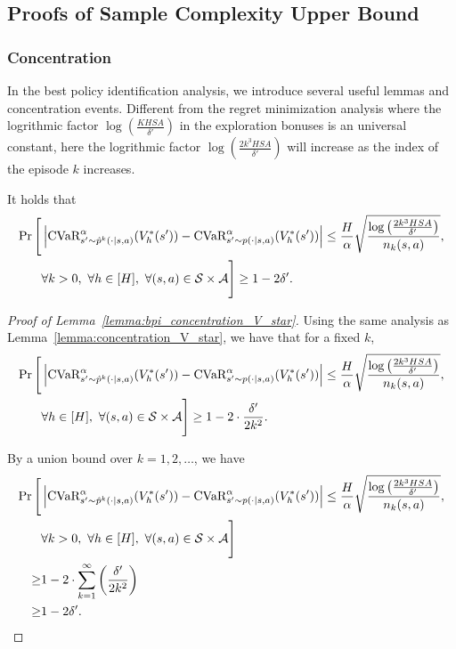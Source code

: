 \subsection{Proofs of Sample Complexity Upper Bound}


\subsubsection{Concentration}

In the best policy identification analysis, we introduce several useful lemmas and concentration events. Different from the regret minimization analysis where the logrithmic factor $\log(\frac{KHSA}{\delta'})$ in the exploration bonuses is an universal constant, here the logrithmic factor $\log(\frac{2 k^3 HSA}{\delta'})$ will increase as the index of the episode $k$ increases.

\begin{lemma} \label{lemma:bpi_concentration_V_star}
	It holds that
	\begin{align*}
		\Pr \Bigg[ & \left| \textup{CVaR}^{\alpha}_{s' \sim \hat{p}^k(\cdot|s,a)}(V^{*}_h(s')) - \textup{CVaR}^{\alpha}_{s' \sim p(\cdot|s,a)}(V^{*}_h(s')) \right| \leq \frac{H}{\alpha}\sqrt{\frac{ \log \left( \frac{2 k^3 HSA}{\delta'} \right) }{n_k(s,a)}} ,
		\\ & \forall k>0,\ \forall h \in [H],\ \forall (s,a) \in \mathcal{S} \times \mathcal{A} \Bigg] \geq 1-2\delta' .
	\end{align*}
\end{lemma}
\begin{proof}[Proof of Lemma~\ref{lemma:bpi_concentration_V_star}]
	Using the same analysis as Lemma~\ref{lemma:concentration_V_star}, we have that for a fixed $k$,
	\begin{align*}
		\Pr \Bigg[ & \left| \textup{CVaR}^{\alpha}_{s' \sim \hat{p}^k(\cdot|s,a)}(V^{*}_h(s')) - \textup{CVaR}^{\alpha}_{s' \sim p(\cdot|s,a)}(V^{*}_h(s')) \right| \leq \frac{H}{\alpha}\sqrt{\frac{ \log \left( \frac{2 k^3 HSA}{\delta'} \right) }{n_k(s,a)}} ,
		\\ & \forall h \in [H],\ \forall (s,a) \in \mathcal{S} \times \mathcal{A} \Bigg] \geq 1-2 \cdot \frac{\delta'}{2 k^2} .
	\end{align*}
	
	By a union bound over $k=1,2,\dots$, we have
	\begin{align*}
		\Pr \Bigg[ & \left| \textup{CVaR}^{\alpha}_{s' \sim \hat{p}^k(\cdot|s,a)}(V^{*}_h(s')) - \textup{CVaR}^{\alpha}_{s' \sim p(\cdot|s,a)}(V^{*}_h(s')) \right| \leq \frac{H}{\alpha}\sqrt{\frac{ \log \left( \frac{2 k^3 HSA}{\delta'} \right) }{n_k(s,a)}} ,
		\\ & \forall k>0,\ \forall h \in [H],\ \forall (s,a) \in \mathcal{S} \times \mathcal{A} \Bigg] 
		\\
		\geq & 1-2 \cdot \sum_{k=1}^{\infty} \left( \frac{\delta'}{2 k^2} \right)
		\\
		\geq & 1-2\delta' .
	\end{align*}
\end{proof}


